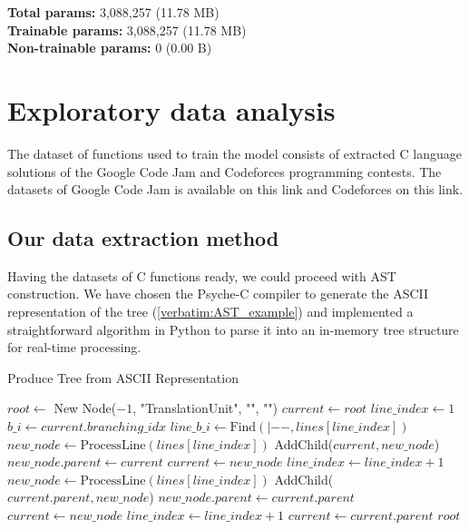 \documentclass[10pt,english,a4paper]{report}
\begin{document}
    \noindent \textbf{Total params:} 3,088,257 (11.78 MB) \\
    \textbf{Trainable params:} 3,088,257 (11.78 MB) \\
    \textbf{Non-trainable params:} 0 (0.00 B)
    


\section{Exploratory data analysis}
\label{item:EDA}
The dataset of functions used to train the model consists of extracted C language solutions of the Google Code Jam and Codeforces programming contests. The datasets of Google Code Jam is available on this link and Codeforces on this link.

\subsection{Our data extraction method}

Having the datasets of C functions ready, we could proceed with AST construction.
We have chosen the Psyche-C compiler to generate the ASCII representation of the 
tree (\ref{verbatim:AST_example}) and implemented a straightforward algorithm in Python to parse it into an in-memory tree structure for real-time processing.

\begin{algorithm}
    \caption{Produce Tree from ASCII Representation}
    \begin{algorithmic}[1]
        \State $root \gets$ New Node($-1$, "TranslationUnit", "", "")
        \State $current \gets root$
        \State $line\_index \gets 1$
            \State $b\_i \gets current.branching\_idx$
            \State $line\_b\_i \gets \text{Find}(|--, lines[line\_index])$
                \State $new\_node \gets \text{ProcessLine}(lines[line\_index])$
                \State AddChild($current, new\_node$)
                \State $new\_node.parent \gets current$
                \State $current \gets new\_node$
                \State $line\_index \gets line\_index + 1$
                \State $new\_node \gets \text{ProcessLine}(lines[line\_index])$
                \State AddChild($current.parent, new\_node$)
                \State $new\_node.parent \gets current.parent$
                \State $current \gets new\_node$
                \State $line\_index \gets line\_index + 1$
            \Else
                \State $current \gets current.parent$
            \EndIf
        \EndWhile
        \State \Return $root$
    \EndProcedure
    \end{algorithmic}
    \end{algorithm}
    
\end{document}
